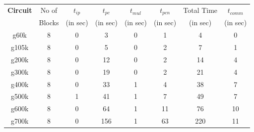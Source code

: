 \documentclass[10pt,psfig,letterpaper,twocolumn]{article}
\begin{document}
\subsubsection*{}
\begin{table}[!ht]
\begin{center}
\begin{tabular}{|c|c|c|c|c|c|c|c|} 
\hline
{\bf Circuit} & No of & $t_{ip}$ & $t_{pc}$ & $t_{mul}$ &  $t_{pcn}$ & Total Time & $t_{comm}$ \\ 
              & Blocks& (in sec)& (in sec)  & (in sec)  &  (in sec)  & (in sec)   & (in sec)   \\ \hline 
g60k& 8 & 0 &  3& 0&1&  4& 0     \\ \hline 
g105k&8 & 0 &  5& 0&2&  7& 1     \\ \hline 
g200k&8 & 0 & 12& 0&2& 14& 4     \\ \hline 
g300k&8 & 0 & 19& 0&2& 21& 4   \\ \hline 
g400k&8 & 0 & 33& 1&4& 38& 7   \\ \hline 
g500k&8 & 1 & 41& 1&7& 49& 7   \\ \hline 
g600k&8 & 0 & 64& 1&11&76& 10 \\ \hline 
g700k&8 & 0 & 156&1&63&220&11 \\ \hline 
\end {tabular}
\end {center}
\end {table}


\subsection*{}

\subsubsection*{}
\end{document}

